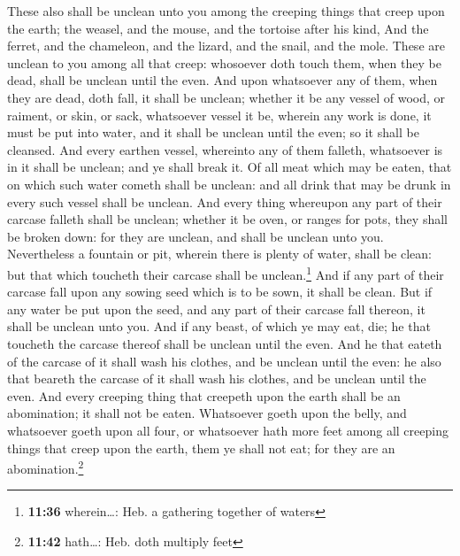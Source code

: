  These also shall be unclean unto you among the creeping
things that creep upon the earth; the weasel, and the mouse, and the
tortoise after his kind,  And the ferret, and the
chameleon, and the lizard, and the snail, and the mole. 
These are unclean to you among all that creep: whosoever doth touch
them, when they be dead, shall be unclean until the even.
 And upon whatsoever any of them, when they are dead,
doth fall, it shall be unclean; whether it be any vessel of wood, or
raiment, or skin, or sack, whatsoever vessel it be, wherein any work is
done, it must be put into water, and it shall be unclean until the even;
so it shall be cleansed.  And every earthen vessel,
whereinto any of them falleth, whatsoever is in it shall be unclean; and
ye shall break it.  Of all meat which may be eaten, that
on which such water cometh shall be unclean: and all drink that may be
drunk in every such vessel shall be unclean.  And every
thing whereupon any part of their carcase falleth shall be unclean;
whether it be oven, or ranges for pots, they shall be broken down: for
they are unclean, and shall be unclean unto you. 
Nevertheless a fountain or pit, wherein there is plenty of water, shall
be clean: but that which toucheth their carcase shall be
unclean.\footnote{\textbf{11:36} wherein\ldots: Heb. a gathering
  together of waters}  And if any part of their carcase
fall upon any sowing seed which is to be sown, it shall be clean.
 But if any water be put upon the seed, and any part of
their carcase fall thereon, it shall be unclean unto you.
 And if any beast, of which ye may eat, die; he that
toucheth the carcase thereof shall be unclean until the even.
 And he that eateth of the carcase of it shall wash his
clothes, and be unclean until the even: he also that beareth the carcase
of it shall wash his clothes, and be unclean until the even.
 And every creeping thing that creepeth upon the earth
shall be an abomination; it shall not be eaten. 
Whatsoever goeth upon the belly, and whatsoever goeth upon all four, or
whatsoever hath more feet among all creeping things that creep upon the
earth, them ye shall not eat; for they are an abomination.\footnote{\textbf{11:42}
  hath\ldots: Heb. doth multiply feet}


